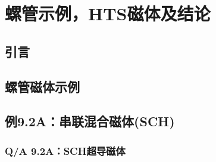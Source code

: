 \chapter{螺管示例，HTS磁体及结论}
\section{引言}




\section{螺管磁体示例}



\section*{例9.2A：串联混合磁体(SCH)}


\subsection*{Q/A 9.2A：SCH超导磁体}

